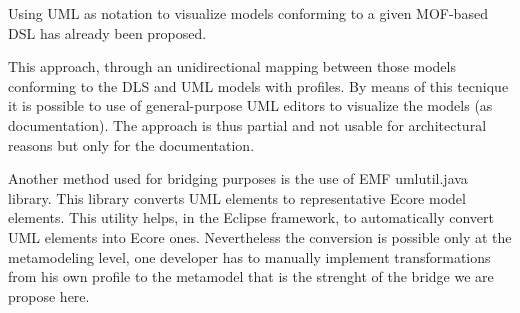 Using UML as notation to visualize models conforming to a given MOF-based DSL has already been proposed.


This approach, through an unidirectional mapping between those models conforming to the DLS and UML models with profiles. By means of this tecnique it is possible to use of general-purpose UML editors to visualize the models (as documentation). The approach is thus partial and not usable for architectural reasons but only for the documentation.

Another method used for bridging purposes is the use of EMF umlutil.java library. This library converts UML elements to representative Ecore model elements. This utility helps, in the Eclipse framework, to automatically convert UML elements into Ecore ones. Nevertheless the conversion is possible only at the metamodeling level, one developer has to manually implement transformations from his own profile to the metamodel that is the strenght of the bridge we are propose here.

